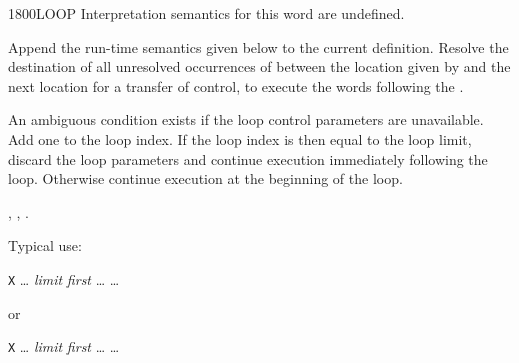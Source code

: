 \begin{worddef}{1800}{LOOP}
\interpret
	Interpretation semantics for this word are undefined.

\compile

	Append the run-time semantics given below to the current
	definition. Resolve the destination of all unresolved
	occurrences of  between the location given by
	 and the next location for a transfer of
	control, to execute the words following the .

\runtime
	\stack{}{}

	An ambiguous condition exists if the loop control parameters are
	unavailable. Add one to the loop index. If the loop index is then
	equal to the loop limit, discard the loop parameters and continue
	execution immediately following the loop. Otherwise continue
	execution at the beginning of the loop.

\see {},
	,
	.

	\begin{rationale} %
		Typical use:

		\tab \word{:} \texttt{X} {\ldots}
			\emph{limit} \emph{first} 
				{\ldots}
		{\ldots} \word{;}

		or

		\tab \word{:} \texttt{X} {\ldots}
			\emph{limit} \emph{first} 
				{\ldots}
		{\ldots} \word{;}
	\end{rationale}

	\begin{testing} %
		 \\
		 \\
		 \\
	\end{testing}
\end{worddef}


